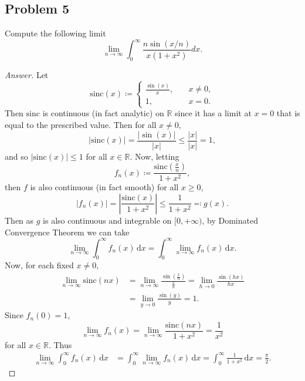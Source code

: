 \documentclass[12pt]{article}
\newcommand{\real}{\mathbb{R}}
\newcommand\paren[1]{\left( #1 \right)}
\newcommand{\abs}[1]{\left | #1 \right |}
\renewcommand{\i}[4]{\int_{#1}^{#2} {#3} \, \mathrm{d} {#4} }
\theoremstyle{definition}
\begin{document}
\subsection{Problem 5}
Compute the following limit 
\[
    \lim\limits_{n \to \infty} \int_0^{\infty} \frac{n \sin(x/n)}{x \paren{ 1 + x^2 }} dx . 
\]
\begin{proof}[Answer]
    Let 
    \[
        \mathrm{sinc}(x) \coloneqq 
        \begin{cases}
            \frac{\sin(x)}{x} , & \quad x \neq 0 , \\ 
            1 , & \quad x = 0 . 
        \end{cases}
    \]
    Then $\mathrm{sinc}$ is continuous (in fact analytic) on $\real$ since it has a limit at $x = 0$ that is equal to the prescribed value. Then for all $x \neq 0$, 
    \[
        \abs{ \mathrm{sinc}(x) } = \frac{ \abs{ \sin(x) } }{ \abs{x} } \leq \frac{\abs{x}}{\abs{x}} = 1 , 
    \]
    and so $\abs{ \mathrm{sinc}(x) } \leq 1$ for all $x \in \real$. Now, letting 
    \[
        f_n(x) \coloneqq \frac{ \mathrm{sinc} \paren{ \frac{x}{n} } }{ 1 + x^2 } , 
    \]
    then $f$ is also continuous (in fact smooth) for all $x \geq 0$, 
    \[
        \abs{ f_n(x) } = \abs{ \frac{ \mathrm{sinc}(x) }{ 1 + x^2 } } \leq \frac{1}{1 + x^2} \eqqcolon g(x) . 
    \]
    Then as $g$ is also continuous and integrable on $[0,+\infty)$, by Dominated Convergence Theorem we can take 
    \[
        \lim\limits_{n \to \infty} \i{0}{\infty}{ f_n(x) }{x} = \i{0}{\infty}{ \lim\limits_{n \to \infty} f_n(x) }{x} .  
    \]
    Now, for each fixed $x \neq 0$, 
    \begin{align*}
        \lim\limits_{n \to \infty} \mathrm{sinc}(nx) & = \lim\limits_{n \to \infty} \frac{ \sin \paren{ \frac{x}{n} } }{ \frac{x}{n} } = \lim\limits_{h \to 0} \frac{ \sin(hx) }{hx} \\ 
        & = \lim\limits_{y \to 0} \frac{\sin(y)}{y} = 1 .
    \end{align*}
    Since $f_n(0) = 1$, 
    \[
        \lim\limits_{n \to \infty} f_n(x) = \lim\limits_{n \to \infty} \frac{ \mathrm{sinc}(nx) }{ 1 + x^2 } = \frac{1}{x^2}
    \]
    for all $x \in \real$. Thus 
    \begin{align*}
        \lim\limits_{n \to \infty} \i{0}{\infty}{ f_n(x) }{x} & = \i{0}{\infty}{ \lim\limits_{n \to \infty} f_n(x) }{x} = \i{0}{\infty}{ \frac{1}{1 + x^2} }{x} = \boxed{ \frac{\pi}{2} . }
    \end{align*}
\end{proof}
\end{document}
